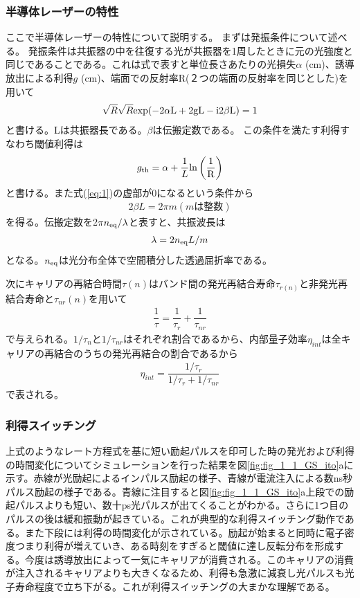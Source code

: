 \subsubsection{半導体レーザーの特性}
ここで半導体レーザーの特性について説明する。
まずは発振条件について述べる。
発振条件は共振器の中を往復する光が共振器を1周したときに元の光強度と同じであることである。これは式で表すと単位長さあたりの光損失$\alpha$ (cm)、誘導放出による利得$g$ (cm)、端面での反射率R(２つの端面の反射率を同じとした)を用いて
\begin{eqnarray}
\sqrt{R}\sqrt{R} \rm{exp}(-2\alpha L+ 2gL-i2\beta L)=1
\label{eq:1}
\end{eqnarray}
と書ける。Lは共振器長である。$\beta$は伝搬定数である。
この条件を満たす利得すなわち閾値利得は
\begin{equation}
g_{\rm{th}}=\alpha+\dfrac{1}{L}\rm{ln}\left(\dfrac{1}{R}\right)
\end{equation}
と書ける。また式(\ref{eq:1})の虚部が0になるという条件から
\begin{eqnarray}
2\beta L=2\pi m   (mは整数)
\end{eqnarray}
を得る。伝搬定数を2$\pi n_{\rm{eq}}/\lambda$と表すと、共振波長は
\begin{eqnarray}
\lambda =2n_{\rm{eq}}L/m
\end{eqnarray}
となる。$n_{\rm{eq}}$は光分布全体で空間積分した透過屈折率である。

次にキャリアの再結合時間$\tau(n)$はバンド間の発光再結合寿命$\tau_{r(n)}$と非発光再結合寿命と$\tau_{nr}(n)$を用いて
\begin{eqnarray}
\dfrac{1}{\tau}=\dfrac{1}{\tau_{r}}+\dfrac{1}{\tau_{nr}}
\label{eq:tau_r}
\end{eqnarray}
で与えられる。$1/\tau_{n}$と$1/\tau_{nr}$はそれぞれ割合であるから、内部量子効率$\eta_{int}$は全キャリアの再結合のうちの発光再結合の割合であるから
\begin{eqnarray}
\eta_{int}=\dfrac{1/\tau_{r}}{1/\tau_{r}+1/\tau_{nr}}
\end{eqnarray}
で表される。
\subsubsection{利得スイッチング}
上式のようなレート方程式を基に短い励起パルスを印可した時の発光および利得の時間変化についてシミュレーションを行った結果を図\ref{fig:fig_1_1_GS_ito}aに示す。赤線が光励起によるインパルス励起の様子、青線が電流注入による数ns秒パルス励起の様子である。青線に注目すると図\ref{fig:fig_1_1_GS_ito}a上段での励起パルスよりも短い、数十ps光パルスが出てくることがわかる。さらに1つ目のパルスの後は緩和振動が起きている。これが典型的な利得スイッチング動作である。また下段には利得の時間変化が示されている。励起が始まると同時に電子密度つまり利得が増えていき、ある時刻をすぎると閾値に達し反転分布を形成する。今度は誘導放出によって一気にキャリアが消費される。このキャリアの消費が注入されるキャリアよりも大きくなるため、利得も急激に減衰し光パルスも光子寿命程度で立ち下がる。これが利得スイッチングの大まかな理解である。

